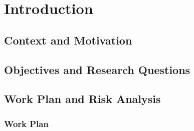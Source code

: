 \chapter{Introduction}
\label{chap:introduction}


\section{Context and Motivation}
\label{sec:intro-context}


\section{Objectives and Research Questions}
\label{sec:intro-objectives}


\section{Work Plan and Risk Analysis}
\label{sec:intro-workplan}

\subsection{Work Plan}
\label{subsec:intro-workplan}


